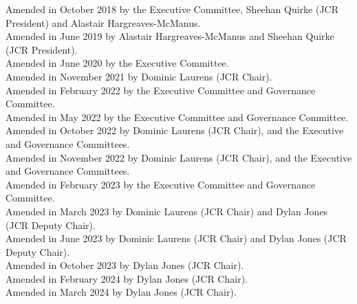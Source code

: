 \documentclass[12pt]{article}
\begin{document}
Amended in October 2018 by the Executive Committee, Sheehan Quirke (JCR President) and Alastair Hargreaves-McManus.\\
Amended in June 2019 by Alastair Hargreaves-McManus and Sheehan Quirke (JCR President).\\
Amended in June 2020 by the Executive Committee.\\
Amended in November 2021 by Dominic Laurens (JCR Chair).\\
Amended in February 2022 by the Executive Committee and Governance Committee.\\
Amended in May 2022 by the Executive Committee and Governance Committee.\\
Amended in October 2022 by Dominic Laurens (JCR Chair), and the Executive and Governance Committees. \\
Amended in November 2022 by Dominic Laurens (JCR Chair), and the Executive and Governance Committees. \\
Amended in February 2023 by the Executive Committee and Governance Committee.\\
Amended in March 2023 by Dominic Laurens (JCR Chair) and Dylan Jones (JCR Deputy Chair). \\
Amended in June 2023 by Dominic Laurens (JCR Chair) and Dylan Jones (JCR Deputy Chair). \\
Amended in October 2023 by Dylan Jones (JCR Chair). \\
Amended in February 2024 by Dylan Jones (JCR Chair). \\
Amended in March 2024 by Dylan Jones (JCR Chair). \\

\newpage
\tableofcontents{}
\newpage
\end{document}
